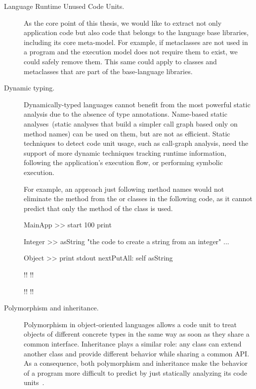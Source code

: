 \begin{description}

\item[Language Runtime Unused Code Units.] As the core point of this thesis, we would like to extract not only application code but also code that belongs to the language base libraries, including its core meta-model. For example, if metaclasses are not used in a program and the \VM execution model does not require them to exist, we could safely remove them. This same could apply to classes and metaclasses that are part of the base-language libraries.

\item[Dynamic typing.] Dynamically-typed languages cannot benefit from the most powerful static analysis due to the absence of type annotations. Name-based static analyses~(static analyses that build a simpler call graph based only on method names) can be used on them, but are not as efficient. Static techniques to detect code unit usage, such as call-graph analysis, need the support of more dynamic techniques \eg tracking runtime information, following the application's execution flow, or performing symbolic execution.

For example, an approach just following method names would not eliminate the  method from the  or  classes in the following code, as it cannot predict that only the  method of the  class is used.

\begin{code}
MainApp >> start
    100 print

Integer >> asString
    "the code to create a string from an integer"
    ...

Object >> print
    stdout nextPutAll: self asString

!!
!!

!!
!!
\end{code}

\item[Polymorphism and inheritance.] Polymorphism in object-oriented languages allows a code unit to treat objects of different concrete types in the same way as soon as they share a common interface. Inheritance plays a similar role: any class can extend another class and provide different behavior while sharing a common API.
As a consequence, both polymorphism and inheritance make the behavior of a program more difficult to predict by just statically analyzing its code units~\cite{Taen89a}.


\end{description}
